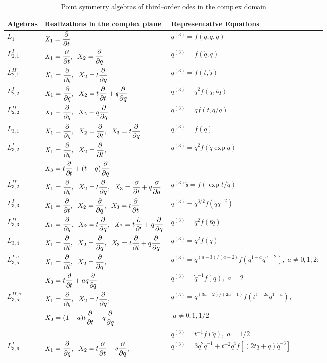 \begin{table}
\label{ch2:tab1}
\begin{center}
\caption{Point symmetry algebras of third--order odes in the complex domain} 
\begin{tabular}{|l|l|l|}
\hline
Algebras  & Realizations in the complex plane & Representative Equations \\
\hline \hline
$ L_1$  &  $X_1=\dt$ & $q^{(3)}=f(q,\dot q,\ddot q)$ \\
\hline
$ L_{2,1}^I$ &  $X_1=\dt,\;\;X_2=\dq$ & $q^{(3)}=f(\dot q,\ddot q)$  \\
\hline
$L_{2,1}^{II}$  & $X_1=\dq,\;\;X_2=t\dq$ & $q^{(3)}=f(t,\ddot q)$\\
\hline
$L_{2,2}^{I}$ & $X_1=\dq,\;\;X_2=t\dt+q\dq$ &
$q^{(3)}=\ddot q^2 f(\dot q,t\ddot q)$\\
\hline
$L_{2,2}^{II}$ & $X_1=\dq,\;\;X_2=q\dq$ & $q^{(3)}=\dot q f(t,\ddot q/\dot q)$ \\
\hline
$L_{3,1}$ & $X_1=\dq,\;\;X_2=\dt,\;\;X_3=t\dq$ & $q^{(3)}=f(\ddot q)$\\
\hline
$L_{3,2}^I$ & $X_1=\dq,\;\;X_2=\dt,$ &
$q^{(3)}=\ddot q^2f(\ddot q\exp \dot q)$\\
& $X_3=t\dt+(t+q)\dq$    &       \\
\hline
$L_{3,2}^{II}$ & $X_1=\dq,\;\;X_2=t\dq,\;\;X_3=\dt+q\dq$ &
$q^{(3)}\ddot q=f(\exp t/\ddot q)$ \\
\hline
$L_{3,3}^I $ & $X_1=\dt,\;\;X_2=\dq,\;\;X_3=t\dt$ &
$q^{(3)}=\ddot q ^{3/2}f(\ddot q\dot q^{-2})$\\
\hline
$L_{3,3}^{II} $ & $X_1=\dq,\;\;X_2=t\dq,\;\;X_3=t\dt+q\dq$ &
$q^{(3)}=\ddot q^2f(t\ddot q)$\\
\hline
$L_{3,4} $ & $X_1=\dt,\;\;X_2=\dq,\;\;X_3=t\dt+q\dq$  &
$q^{(3)}=\ddot q^2f(\dot q)$\\
\hline
$L_{3,5}^{I,a} $ & $X_1=\dt,\;\;X_2=\dq,$ &
$q^{(3)}=\ddot q^{(a-3)/(a-2)}f(\ddot q^{1-a}\dot q^{a-2}),\;a\ne 0,1,2;$\\
 & $X_3=t\dt+aq\dq$ & $q^{(3)}=\dot q^{-1}f(\ddot q),\; a=2$ \\
\hline
$L_{3,5}^{II,a} $ & $X_1=\dq,\;\;X_2=t\dq,$ &
$q^{(3)}=\ddot q^{(3a-2)/(2a-1)}f(t^{1-2a}\ddot q^{1-a}),$\\
 & $X_3=(1-a)t\dt+q\dq$  &  $\;a\ne 0,1,1/2;$\\
 &  & $q^{(3)}=t^{-1}f(\ddot q),\; a=1/2$ \\
\hline
$L_{3,6}^I$ & $ X_1=\dq,\;\;X_2=t\dt+q\dq,$ &
$ q^{(3)}= 3\ddot q^2\dot q^{-1}
+t^{-2}\dot q^4 f[(2t\ddot q+\dot q)\dot q^{-3}]$\\

\end{tabular}
\end{center}
\end{table}
